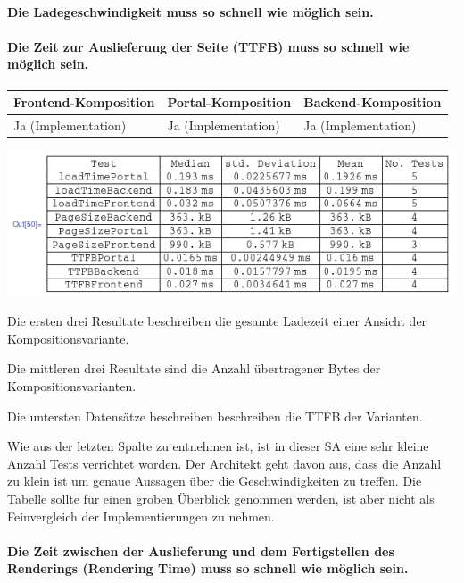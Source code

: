 \paragraph{Die Ladegeschwindigkeit muss so schnell wie möglich sein.}

\paragraph{Die Zeit zur Auslieferung der Seite (\ac{TTFB}) muss so schnell wie möglich sein.}

\begin{tabularx}{\linewidth}{| Y | Y | Y |}
    \hline
    Frontend-Komposition & Portal-Komposition & Backend-Komposition
    \\ \hline
    Ja (Implementation) & Ja (Implementation) & Ja (Implementation) 
    \\ \hline
\end{tabularx}

\includegraphics[width=\textwidth]{sections/results/PerformanceTests}

Die ersten drei Resultate beschreiben die gesamte Ladezeit einer Ansicht der Kompositionsvariante.

Die mittleren drei Resultate sind die Anzahl übertragener Bytes der Kompositionsvarianten.

Die untersten Datensätze beschreiben beschreiben die \ac{TTFB} der Varianten.

Wie aus der letzten Spalte zu entnehmen ist, ist in dieser SA eine sehr kleine Anzahl Tests verrichtet worden. Der Architekt geht davon aus, dass die Anzahl zu klein ist um genaue Aussagen über die Geschwindigkeiten zu treffen. Die Tabelle sollte für einen groben Überblick genommen werden, ist aber nicht als Feinvergleich der Implementierungen zu nehmen.

\paragraph{Die Zeit zwischen der Auslieferung und dem Fertigstellen des Renderings (Rendering Time) muss so schnell wie möglich sein.}

